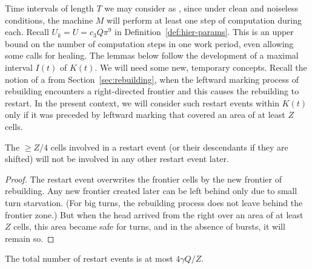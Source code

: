 \documentclass[11pt]{memoir}
\theoremstyle{definition} %
\renewcommand{\ge}{\geq}
\newcommand{\fld}[1]{\ensuremath{\textit{#1\/}}}
\def\U{U}
\newcommand{\passno}{\pi}
\newcommand{\Q}{Q} %
\newcommand{\Tu}{T}
\newcommand{\Z}{Z} %
\newcommand{\Info}{\fld{Info}}
\begin{document}


Time intervals of length \( \Tu \) we may consider as , since under clean and
noiseless conditions,
the machine \( M \) will perform at least one step of computation during each.
Recall  \( \U_{k} = \U =c_{3}\Q\passno^{9} \) in Definition~\ref{def:hier-params}.
This is an upper bound on the number of computation steps in one work period, even
allowing some calls for healing.
The lemmas below
follow the development of a maximal interval \( I(t) \) of \( K(t) \).
We will need some new, temporary concepts.
Recall the notion of a  from Section~\ref{sec:rebuilding}, when the leftward
marking process of rebuilding encounters a right-directed frontier and this causes
the rebuilding to restart.
In the present context, we will consider such restart events within \( K(t) \) only if
it was preceded by leftward marking that covered an area of at least \( \Z \) cells.

\begin{lemma}\label{lem:escape.restarts}
  The \( \ge\Z/4 \) cells involved in a restart event (or their descendants if they are shifted)
  will not be involved in any other restart event later.
\end{lemma}
\begin{proof}
  The restart event overwrites the frontier cells by the new frontier of rebuilding.
  Any new frontier created later can be left behind only due to small turn starvation.
  (For big turns, the rebuilding process does not leave behind the frontier zone.)  
  But when the head arrived from the right over an area of at least \( \Z \) cells, this area
  became safe for turns, and in the absence of bursts, it will remain so.
\end{proof}
\begin{corollary}\label{crl:escape.restarts}
  The total number of restart events is at most \( 4\gamma\Q/\Z \).
\end{corollary}
\end{document}
